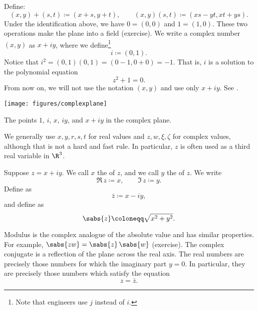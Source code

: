 Define:
\begin{equation*}
(x,y) + (s,t) \coloneqq (x+s,y+t) , \qquad
(x,y) (s,t) \coloneqq (xs-yt,xt+ys) .
\end{equation*}
Under the identification above, we have $0 = (0,0)$ and $1 = (1,0)$.  These
two operations make the plane into a field (exercise).
We write a complex number $(x,y)$ as $x+iy$, where we
define\footnote{Note that engineers use $j$ instead of $i$.}
\begin{equation*}
i \coloneqq (0,1) .
\end{equation*}
Notice that $i^2 = (0,1)(0,1) = (0-1,0+0) = -1$.
That is, $i$ is a solution to the polynomial equation
\begin{equation*}
z^2+1=0 .
\end{equation*}
From now on, we will not use the notation $(x,y)$ and use only $x+iy$.
See .
\begin{myfigureht}
\texttt{[image: figures/complexplane]}
\caption{The points $1$, $i$, $x$, $iy$, and $x+iy$ in the complex
plane.\label{fig:complexplane}}
\end{myfigureht}

We generally use $x,y,r,s,t$ for real values and $z,w,\xi,\zeta$
for complex values, although that is not a hard and fast rule.  In
particular, $z$ is often used as a third real variable in $\R^3$.

\begin{defn}
Suppose $z= x+iy$.
We call $x$ 
the \emph{} of $z$, and 
we call $y$
the \emph{} of $z$.  We write
\begin{equation*}
\Re\, z \coloneqq x , \qquad
\Im\, z \coloneqq y .
\end{equation*}
Define 
\emph{} as
\begin{equation*}
\bar{z} \coloneqq x-iy ,
\end{equation*}
and define \emph{} as
\begin{equation*}
\sabs{z} \coloneqq \sqrt{x^2+y^2} .
\end{equation*}
\end{defn}

Modulus is the complex analogue of the absolute value and
has similar properties.
For example,
$\sabs{zw} = \sabs{z} \, \sabs{w}$ (exercise).
The complex conjugate is a reflection of the plane across the real axis.
The real numbers are precisely those numbers for which the imaginary
part $y=0$.  In particular, they are precisely those numbers which satisfy
the equation
\begin{equation*}
z = \bar{z} .
\end{equation*}

